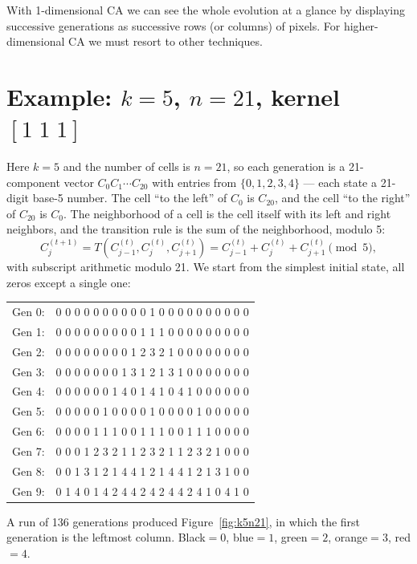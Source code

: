 With 1-dimensional CA we can see the whole evolution at a glance by
displaying successive generations as successive rows (or columns) of
pixels.  For higher-dimensional CA we must resort to other techniques.

\section{Example: $k=5$, $n=21$, kernel $[1\;1\;1]$}
\label{sec:k5n21}

Here $k=5$ and the number of cells is $n=21$, so each generation is a
21-component vector $C_0C_1\cdots C_{20}$ with entries from
$\{0,1,2,3,4\}$ --- each state a 21-digit base-5 number.  The cell ``to
the left'' of $C_0$ is $C_{20}$, and the cell ``to the right'' of
$C_{20}$ is $C_0$.  The neighborhood of a cell is the cell itself with
its left and right neighbors, and the transition rule is the sum of the
neighborhood, modulo 5:
\begin{equation}
  C^{(t+1)}_j = T(C^{(t)}_{j-1}, C^{(t)}_j, C^{(t)}_{j+1})
  = C^{(t)}_{j-1} + C^{(t)}_j + C^{(t)}_{j+1} \pmod 5,
\end{equation}
with subscript arithmetic modulo 21.  We start from the simplest
initial state, all zeros except a single one:

\begin{center}\ttfamily\small
\begin{tabular}{ll}
Gen 0: & 0 0 0 0 0 0 0 0 0 0 1 0 0 0 0 0 0 0 0 0 0\\
Gen 1: & 0 0 0 0 0 0 0 0 0 1 1 1 0 0 0 0 0 0 0 0 0\\
Gen 2: & 0 0 0 0 0 0 0 0 1 2 3 2 1 0 0 0 0 0 0 0 0\\
Gen 3: & 0 0 0 0 0 0 0 1 3 1 2 1 3 1 0 0 0 0 0 0 0\\
Gen 4: & 0 0 0 0 0 0 1 4 0 1 4 1 0 4 1 0 0 0 0 0 0\\
Gen 5: & 0 0 0 0 0 1 0 0 0 0 1 0 0 0 0 1 0 0 0 0 0\\
Gen 6: & 0 0 0 0 1 1 1 0 0 1 1 1 0 0 1 1 1 0 0 0 0\\
Gen 7: & 0 0 0 1 2 3 2 1 1 2 3 2 1 1 2 3 2 1 0 0 0\\
Gen 8: & 0 0 1 3 1 2 1 4 4 1 2 1 4 4 1 2 1 3 1 0 0\\
Gen 9: & 0 1 4 0 1 4 2 4 4 2 4 2 4 4 2 4 1 0 4 1 0\\
\end{tabular}
\end{center}

A run of 136 generations produced Figure~\ref{fig:k5n21}, in which the
first generation is the leftmost column.  Black${}=0$, blue${}=1$,
green${}=2$, orange${}=3$, red${}=4$.


